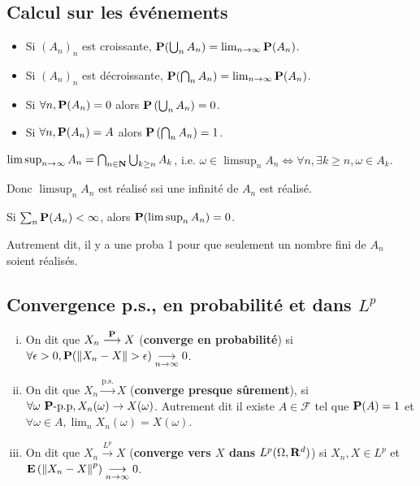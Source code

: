 \subsection{Calcul sur les événements}

	\begin{pop}
		\begin{itemize}
			\item[\textbullet] Si $(A_n)_n$ est croissante, $\mathbf{P}(\bigcup_n A_n) = \lim_{n \to \infty} \mathbf{P}(A_n)$.
			\item[\textbullet] Si $(A_n)_n$ est décroissante, $\mathbf{P}(\bigcap_n A_n) = \lim_{n \to \infty} \mathbf{P}(A_n)$.
			\item[\textbullet] Si $\forall n, \mathbf{P}(A_n) = 0$ alors $\mathbf{P} \left( \bigcup_n A_n \right) = 0$.
			\item[\textbullet] Si $\forall n, \mathbf{P}(A_n) = A$ alors $\mathbf{P} \left( \bigcap_n A_n \right) = 1$.
		\end{itemize}
	\end{pop}
	
	\begin{defn}
		$\limsup_{n \to \infty} A_n = \bigcap_{n \in \mathbf{N}} \bigcup_{k \geq n} A_k$, i.e. $\omega \in \limsup_n A_n \iff \forall n, \exists k \geq n, \omega \in A_k$.
	\end{defn}
	
	Donc $\limsup_n A_n$ est réalisé ssi une infinité de $A_n$ est réalisé.
	
	\begin{lem}
		Si $\sum_n \mathbf{P}(A_n) < \infty$, alors $\mathbf{P}(\limsup_n A_n) = 0$.
	\end{lem}

	Autrement dit, il y a une proba 1 pour que seulement un nombre fini de $A_n$ soient réalisés.


\subsection{Convergence p.s., en probabilité et dans $L^p$}

	\begin{defn}
		\begin{enumerate}[(i)]
			\item On dit que $X_n \overset{\mathbf{P}}{\longrightarrow} X$ (\textbf{converge en probabilité}) si $\forall \epsilon > 0, \mathbf{P}(\left\lVert X_n - X\right\rVert > \epsilon) \underset{n \to \infty}{\longrightarrow} 0$.
			\item On dit que $X_n \overset{\text{p.s.}}{\longrightarrow} X$ (\textbf{converge presque sûrement}), si $\forall \omega\ \mathbf{P}\text{-p.p}, X_n(\omega) \to X(\omega)$.
				Autrement dit il existe $A \in \mathcal{F}$ tel que $\mathbf{P}(A) = 1$ et $\forall \omega \in A, \lim_n X_n(\omega) = X(\omega)$.
			\item On dit que $X_n \overset{L^p}{\longrightarrow} X$ (\textbf{converge vers $X$ dans $L^p(\Omega, \mathbf{R}^d)$}) si $X_n, X \in L^p$ et $\mathbf{E} \left( \left\lVert X_n - X\right\rVert^p \right) \underset{n \to \infty}{\longrightarrow} 0$. 
		\end{enumerate}
	\end{defn}

